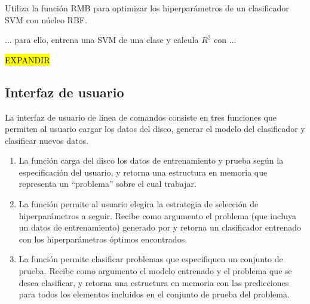 \documentclass[12pt,bibliography=oldstyle,DIV=12,parskip=half-]{scrreprt}
\begin{document}
\subsubsection{}
%
Utiliza la función RMB para optimizar los hiperparámetros de un
clasificador SVM con núcleo RBF.

... para ello, entrena una SVM de una clase y calcula $R^2$ con
 ...

\hl{EXPANDIR}
%
%
\subsection{Interfaz de usuario}
%
La interfaz de usuario de línea de comandos consiste en
tres funciones que permiten al usuario cargar los datos del disco,
generar el modelo del clasificador y clasificar nuevos datos.
%
\begin{enumerate}
\item La función  carga del disco los datos de
  entrenamiento y prueba según la especificación del usuario, y
  retorna una estructura en memoria que representa un ``problema''
  sobre el cual trabajar.
\item La función  permite al usuario elegira la
  estrategia de selección de hiperparámetros a seguir. Recibe como
  argumento el problema (que incluya un datos de entrenamiento)
  generado por  y retorna un clasificador entrenado
  con los hiperparámetros óptimos encontrados.
\item La función  permite clasificar problemas
  que especifiquen un conjunto de prueba.  Recibe como argumento el
  modelo entrenado y el problema que se desea clasificar, y retorna
  una estructura en memoria con las predicciones para todos los
  elementos incluidos en el conjunto de prueba del problema.
\end{enumerate}
%

\end{document}
